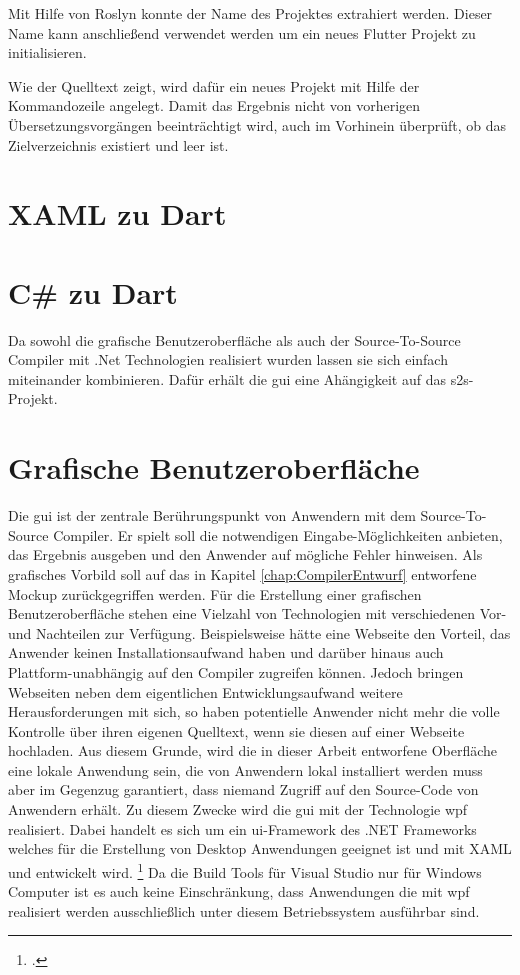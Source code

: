 Mit Hilfe von Roslyn konnte der Name des Projektes extrahiert werden.  Dieser Name kann anschließend verwendet werden um ein neues Flutter Projekt zu initialisieren.  

Wie der Quelltext zeigt,  wird dafür ein neues Projekt mit Hilfe der Kommandozeile angelegt.  Damit das Ergebnis nicht von vorherigen Übersetzungsvorgängen beeinträchtigt wird,  auch im Vorhinein überprüft,  ob das Zielverzeichnis existiert und leer ist. 

\section{XAML zu Dart}

\section{C\# zu Dart}


Da sowohl die grafische Benutzeroberfläche als auch der Source-To-Source Compiler mit .Net Technologien realisiert wurden lassen sie sich einfach miteinander kombinieren.  Dafür erhält die  \ac{gui} eine Ahängigkeit auf das \ac{s2s}-Projekt.  



\section{Grafische Benutzeroberfläche}
Die \ac{gui} ist der zentrale Berührungspunkt von Anwendern mit dem Source-To-Source Compiler.  Er spielt soll die notwendigen Eingabe-Möglichkeiten anbieten,  das Ergebnis ausgeben und den Anwender auf mögliche Fehler hinweisen.  Als grafisches Vorbild soll auf das in Kapitel \ref{chap:CompilerEntwurf} entworfene Mockup zurückgegriffen werden.  Für die Erstellung einer grafischen Benutzeroberfläche stehen eine Vielzahl von Technologien mit verschiedenen Vor- und Nachteilen zur Verfügung.  Beispielsweise hätte eine Webseite den Vorteil,  das Anwender keinen Installationsaufwand haben und darüber hinaus auch Plattform-unabhängig auf den Compiler zugreifen können.  Jedoch bringen Webseiten neben dem eigentlichen Entwicklungsaufwand weitere Herausforderungen mit sich,  so haben potentielle Anwender nicht mehr die volle Kontrolle über ihren eigenen Quelltext, wenn sie diesen auf einer Webseite hochladen.  
Aus diesem Grunde,  wird die in dieser Arbeit entworfene Oberfläche eine lokale Anwendung sein,  die von Anwendern lokal installiert werden muss aber im Gegenzug garantiert,  dass niemand Zugriff auf den Source-Code von Anwendern erhält.  Zu diesem Zwecke wird die \ac{gui} mit der Technologie \ac{wpf} realisiert.  Dabei handelt es sich um ein \ac{ui}-Framework des .NET Frameworks welches für die Erstellung von Desktop Anwendungen geeignet ist und mit XAML und \Csharp entwickelt wird.  \footcite[Vgl.][S. 1f]{Wenger2012} Da die Build Tools für Visual Studio nur für Windows Computer ist es auch keine Einschränkung,  dass Anwendungen die mit \ac{wpf} realisiert werden ausschließlich unter diesem Betriebssystem ausführbar sind.

